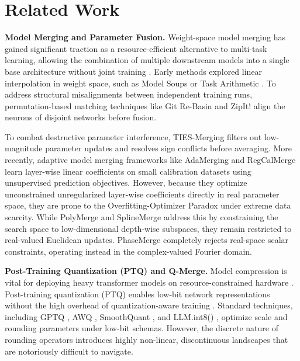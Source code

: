 \section{Related Work}
\label{sec:related_work}

\textbf{Model Merging and Parameter Fusion.} Weight-space model merging has gained significant traction as a resource-efficient alternative to multi-task learning, allowing the combination of multiple downstream models into a single base architecture without joint training \cite{ilharco2022editing, wortsman2022model}. Early methods explored linear interpolation in weight space, such as Model Soups \cite{wortsman2022model} or Task Arithmetic \cite{ilharco2022editing}. To address structural misalignments between independent training runs, permutation-based matching techniques like Git Re-Basin \cite{ainsworth2022git} and ZipIt! \cite{zhang2023zipit} align the neurons of disjoint networks before fusion. 

To combat destructive parameter interference, TIES-Merging \cite{yadav2023ties} filters out low-magnitude parameter updates and resolves sign conflicts before averaging. More recently, adaptive model merging frameworks like AdaMerging \cite{yang2023adamerging} and RegCalMerge \cite{regcalmerge2024} learn layer-wise linear coefficients on small calibration datasets using unsupervised prediction objectives. However, because they optimize unconstrained unregularized layer-wise coefficients directly in real parameter space, they are prone to the Overfitting-Optimizer Paradox under extreme data scarcity. While PolyMerge \cite{polymerge2024} and SplineMerge \cite{splinemerge2024} address this by constraining the search space to low-dimensional depth-wise subspaces, they remain restricted to real-valued Euclidean updates. PhaseMerge completely rejects real-space scalar constraints, operating instead in the complex-valued Fourier domain.

\textbf{Post-Training Quantization (PTQ) and Q-Merge.} Model compression is vital for deploying heavy transformer models on resource-constrained hardware \cite{gholami2021survey}. Post-training quantization (PTQ) enables low-bit network representations without the high overhead of quantization-aware training \cite{frantar2022gptq, lin2023awq}. Standard techniques, including GPTQ \cite{frantar2022gptq}, AWQ \cite{lin2023awq}, SmoothQuant \cite{xiao2023smoothquant}, and LLM.int8() \cite{dettmers2022llm}, optimize scale and rounding parameters under low-bit schemas. However, the discrete nature of rounding operators introduces highly non-linear, discontinuous landscapes that are notoriously difficult to navigate. 

